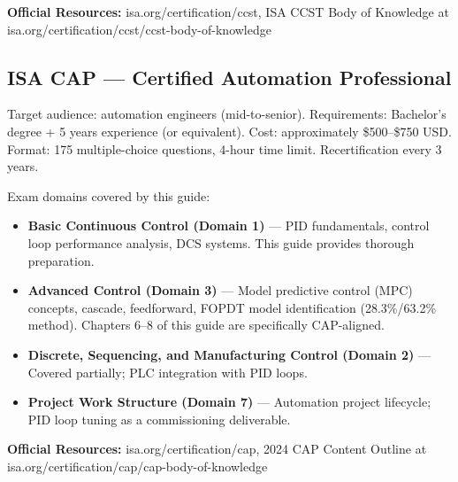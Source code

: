\documentclass[12pt,twoside,openright]{memoir}
\begin{document}
\medskip
\noindent\textbf{Official Resources:} isa.org/certification/ccst, ISA CCST Body of Knowledge at isa.org/certification/ccst/ccst-body-of-knowledge

\subsection{ISA CAP --- Certified Automation Professional}

Target audience: automation engineers (mid-to-senior). Requirements: Bachelor's degree + 5 years experience (or equivalent). Cost: approximately \$500--\$750 USD. Format: 175 multiple-choice questions, 4-hour time limit. Recertification every 3 years.

\noindent Exam domains covered by this guide:
\begin{itemize}
\item \textbf{Basic Continuous Control (Domain 1)} --- PID fundamentals, control loop performance analysis, DCS systems. This guide provides thorough preparation.
\item \textbf{Advanced Control (Domain 3)} --- Model predictive control (MPC) concepts, cascade, feedforward, FOPDT model identification (28.3\%/63.2\% method). Chapters 6--8 of this guide are specifically CAP-aligned.
\item \textbf{Discrete, Sequencing, and Manufacturing Control (Domain 2)} --- Covered partially; PLC integration with PID loops.
\item \textbf{Project Work Structure (Domain 7)} --- Automation project lifecycle; PID loop tuning as a commissioning deliverable.
\end{itemize}

\medskip
\noindent\textbf{Official Resources:} isa.org/certification/cap, 2024 CAP Content Outline at isa.org/certification/cap/cap-body-of-knowledge
\end{document}
